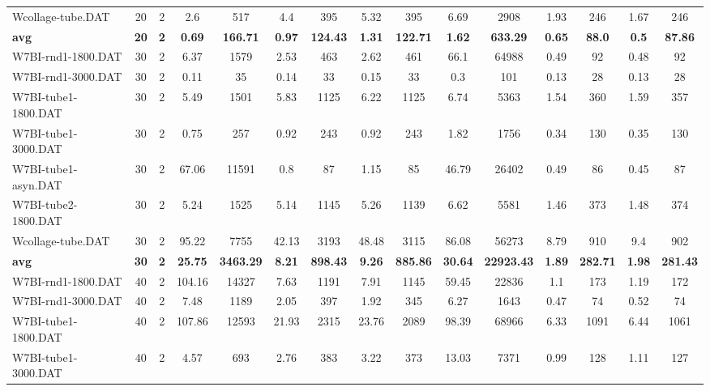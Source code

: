 \begin{table}[!ht]
{\begin{tabular}{lcccccccccccccc}
Wcollage-tube.DAT & 20 & 2 & 2.6 & 517 & 4.4 & 395 & 5.32 & 395 & 6.69 & 2908 & 1.93 & 246 &  \textcolor{blue2}{1.67} & 246 \\
\cline{1-15} \textbf{avg} & \textbf{20} & \textbf{2} & \textbf{0.69} & \textbf{166.71} & \textbf{0.97} & \textbf{124.43} & \textbf{1.31} & \textbf{122.71} & \textbf{1.62} & \textbf{633.29} & \textbf{0.65} & \textbf{88.0} & \textbf{0.5} & \textbf{87.86} \\ \cline{1-15}
W7BI-rnd1-1800.DAT & 30 & 2 & 6.37 & 1579 & 2.53 & 463 & 2.62 & 461 & 66.1 & 64988 & 0.49 & 92 &  \textcolor{blue2}{0.48} & 92 \\
W7BI-rnd1-3000.DAT & 30 & 2 &  \textcolor{blue2}{0.11} & 35 & 0.14 & 33 & 0.15 & 33 & 0.3 & 101 & 0.13 & 28 & 0.13 & 28 \\
W7BI-tube1-1800.DAT & 30 & 2 & 5.49 & 1501 & 5.83 & 1125 & 6.22 & 1125 & 6.74 & 5363 &  \textcolor{blue2}{1.54} & 360 & 1.59 & 357 \\
W7BI-tube1-3000.DAT & 30 & 2 & 0.75 & 257 & 0.92 & 243 & 0.92 & 243 & 1.82 & 1756 &  \textcolor{blue2}{0.34} & 130 & 0.35 & 130 \\
W7BI-tube1-asyn.DAT & 30 & 2 & 67.06 & 11591 & 0.8 & 87 & 1.15 & 85 & 46.79 & 26402 & 0.49 & 86 &  \textcolor{blue2}{0.45} & 87 \\
W7BI-tube2-1800.DAT & 30 & 2 & 5.24 & 1525 & 5.14 & 1145 & 5.26 & 1139 & 6.62 & 5581 &  \textcolor{blue2}{1.46} & 373 & 1.48 & 374 \\
Wcollage-tube.DAT & 30 & 2 & 95.22 & 7755 & 42.13 & 3193 & 48.48 & 3115 & 86.08 & 56273 &  \textcolor{blue2}{8.79} & 910 & 9.4 & 902 \\
\cline{1-15} \textbf{avg} & \textbf{30} & \textbf{2} & \textbf{25.75} & \textbf{3463.29} & \textbf{8.21} & \textbf{898.43} & \textbf{9.26} & \textbf{885.86} & \textbf{30.64} & \textbf{22923.43} & \textbf{1.89} & \textbf{282.71} & \textbf{1.98} & \textbf{281.43} \\ \cline{1-15}
W7BI-rnd1-1800.DAT & 40 & 2 & 104.16 & 14327 & 7.63 & 1191 & 7.91 & 1145 & 59.45 & 22836 &  \textcolor{blue2}{1.1} & 173 & 1.19 & 172 \\
W7BI-rnd1-3000.DAT & 40 & 2 & 7.48 & 1189 & 2.05 & 397 & 1.92 & 345 & 6.27 & 1643 &  \textcolor{blue2}{0.47} & 74 & 0.52 & 74 \\
W7BI-tube1-1800.DAT & 40 & 2 & 107.86 & 12593 & 21.93 & 2315 & 23.76 & 2089 & 98.39 & 68966 &  \textcolor{blue2}{6.33} & 1091 & 6.44 & 1061 \\
W7BI-tube1-3000.DAT & 40 & 2 & 4.57 & 693 & 2.76 & 383 & 3.22 & 373 & 13.03 & 7371 &  \textcolor{blue2}{0.99} & 128 & 1.11 & 127 \\

\end{tabular}}
\end{table}
